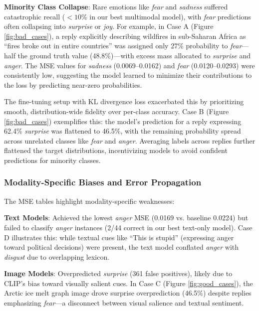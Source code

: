\textbf{Minority Class Collapse}: Rare emotions like \emph{fear} and \emph{sadness} suffered catastrophic recall ($<10\%$ in our best multimodal model), with \emph{fear} predictions often collapsing into \emph{surprise} or \emph{joy}. For example, in Case A (Figure \ref{fig:bad_cases}), a reply explicitly describing wildfires in sub-Saharan Africa as “fires broke out in entire countries” was assigned only 27\% probability to \emph{fear}—half the ground truth value (48.8\%)—with excess mass allocated to \emph{surprise} and \emph{anger}. The MSE values for \emph{sadness} (0.0069–0.0162) and \emph{fear} (0.0120–0.0293) were consistently low, suggesting the model learned to minimize their contributions to the loss by predicting near-zero probabilities.
\newline

The fine-tuning setup with KL divergence loss exacerbated this by prioritizing smooth, distribution-wide fidelity over per-class accuracy. Case B (Figure \ref{fig:bad_cases}) exemplifies this: the model’s prediction for a reply expressing 62.4\% \emph{surprise} was flattened to 46.5\%, with the remaining probability spread across unrelated classes like \emph{fear} and \emph{anger}. Averaging labels across replies further flattened the target distributions, incentivizing models to avoid confident predictions for minority classes.

\subsubsection*{Modality-Specific Biases and Error Propagation}
The MSE tables highlight modality-specific weaknesses:
\newline

\textbf{Text Models}: Achieved the lowest \emph{anger} MSE (0.0169 vs. baseline 0.0224) but failed to classify \emph{anger} instances (2/44 correct in our best text-only model). Case D illustrates this: while textual cues like “This is stupid” (expressing anger toward political decisions) were present, the text model conflated \emph{anger} with \emph{disgust} due to overlapping lexicon.
\newline

\textbf{Image Models}: Overpredicted \emph{surprise} (361 false positives), likely due to CLIP’s bias toward visually salient cues. In Case C (Figure \ref{fig:good_cases}), the Arctic ice melt graph image drove surprise overprediction (46.5\%) despite replies emphasizing \emph{fear}—a disconnect between visual salience and textual sentiment. 
\newline

